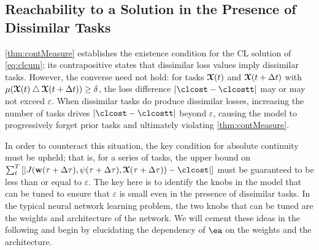 \subsection{Reachability to a Solution in the Presence of Dissimilar Tasks}
\cref{thm:contMeasure} establishes the existence condition for the CL solution of \eqref{eq:clcum}; its contrapositive states that dissimilar loss values imply dissimilar tasks. However, the converse need not hold: for tasks $\boldsymbol{\mathcal{X}}(t)$ and $\boldsymbol{\mathcal{X}}(t+\Delta t)$ with $\mu(\boldsymbol{\mathcal{X}}(t)\bigtriangleup \boldsymbol{\mathcal{X}}(t+\Delta t)) \geq \delta$, the loss difference $\abs{\clcost-\clcostt}$ may or may not exceed $\varepsilon$. When dissimilar tasks do produce dissimilar losses, increasing the number of tasks drives $\abs{\clcost-\clcostt}$ beyond $\varepsilon$, causing the model to progressively forget prior tasks and ultimately violating \cref{thm:contMeasure}.

In order to counteract this situation, the key condition for absolute continuity must be upheld; that is, for a series of tasks, the upper bound on 
$ \sum_{t}^T \left[ \left\vert J(\weight(\tau+\Delta \tau),\psi(\tau+\Delta \tau),\tx(\tau+\Delta \tau)) - \clcost \right\vert \right]$ must be guaranteed to be less than or equal to $\varepsilon$. The key here is to identify the knobs in the model that can be tuned to ensure that $\varepsilon$ is small even in the presence of dissimilar tasks. In the typical neural network learning problem, the two knobs that can be tuned are the weights and architecture of the network. We will cement these ideas in the following and begin by elucidating the dependency of $\ea$ on the weights and the architecture.

